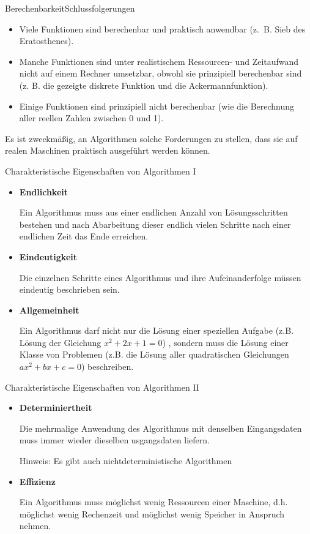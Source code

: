 \documentclass[xelatex,aspectratio=169]{beamer}
\begin{document}
\begin{frame}{Berechenbarkeit}{Schlussfolgerungen}
  \begin{itemize}
    \item Viele Funktionen sind berechenbar und praktisch anwendbar (z.~B. Sieb des Eratosthenes).
    \item Manche Funktionen sind unter realistischem Ressourcen- und Zeitaufwand nicht auf einem Rechner umsetzbar, obwohl sie prinzipiell berechenbar sind (z. B. die gezeigte diskrete Funktion und die Ackermannfunktion).
    \item Einige Funktionen sind prinzipiell nicht berechenbar (wie die Berechnung aller reellen Zahlen zwischen 0 und 1).
  \end{itemize}
  \Rightarrow Es ist zweckmäßig, an Algorithmen solche Forderungen zu stellen, dass sie auf realen Maschinen praktisch ausgeführt werden können.

\end{frame}

\begin{frame}{Charakteristische Eigenschaften von Algorithmen I}
  \begin{itemize}
    \item \textbf{Endlichkeit}

          Ein Algorithmus muss aus einer endlichen Anzahl von Lösungsschritten bestehen und nach Abarbeitung dieser endlich vielen Schritte nach einer endlichen Zeit das Ende erreichen.

    \item \textbf{Eindeutigkeit}

          Die einzelnen Schritte eines Algorithmus und ihre Aufeinanderfolge müssen eindeutig beschrieben sein.
    \item \textbf{Allgemeinheit}

          Ein Algorithmus darf nicht nur die Lösung einer speziellen Aufgabe (z.B. Lösung der Gleichung $x^2 + 2x + 1=0$) , sondern muss die Lösung einer Klasse von Problemen (z.B. die Lösung aller quadratischen Gleichungen $ax^2 + bx + c = 0$) beschreiben.
  \end{itemize}
\end{frame}

\begin{frame}{Charakteristische Eigenschaften von Algorithmen II}
  \begin{itemize}
    \item \textbf{Determiniertheit}

          Die mehrmalige Anwendung des Algorithmus mit denselben Eingangsdaten muss immer wieder dieselben usgangsdaten
          liefern.

          Hinweis: Es gibt auch nichtdeterministische Algorithmen
    \item \textbf{Effizienz}

          Ein Algorithmus muss möglichst wenig Ressourcen einer Maschine, d.h. möglichst wenig Rechenzeit und möglichst wenig Speicher in Anspruch nehmen.
  \end{itemize}
\end{frame}
\end{document}
